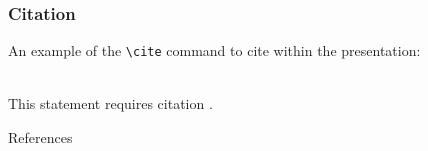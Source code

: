 \documentclass[aspectratio=169,xcolor=dvipsnames, t]{beamer}
\begin{document}

\begin{frame}[fragile] %
    \frametitle{Citation}
    An example of the \verb|\cite| command to cite within the presentation:\\~

    This statement requires citation \cite{rizzi_1976}.
\end{frame}

\begin{frame}[allowframebreaks]{References}
\end{frame}

\makefinalpage
\end{document}
